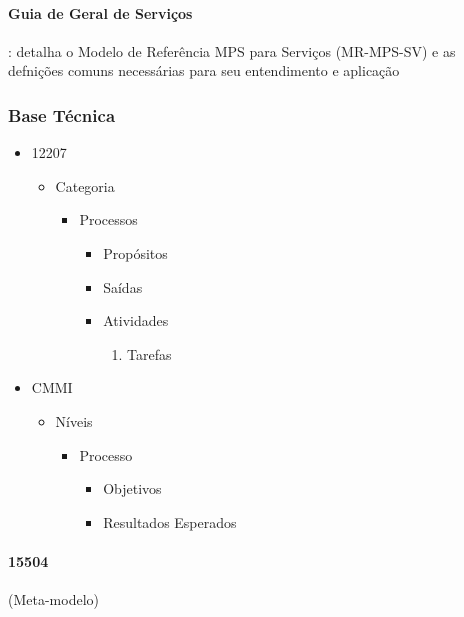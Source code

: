 \documentclass{article}
\begin{document}
\paragraph{Guia de Geral de Serviços} : detalha o Modelo de Referência MPS para Serviços (MR-MPS-SV) e as defnições comuns necessárias para seu entendimento e aplicação

\subsubsection{Base Técnica}
	\begin{itemize}
	\item 12207
		\begin{itemize}
		\item Categoria
			\begin{itemize}
			\item Processos
				\begin{itemize}
				\item Propósitos
				\item Saídas
				\item Atividades
					\begin{enumerate}
					\item Tarefas							
					\end{enumerate}
				\end{itemize}
			\end{itemize}
		\end{itemize}			
	\end{itemize}

	\begin{itemize}
	\item CMMI
		\begin{itemize}
		\item Níveis
			\begin{itemize}
			\item Processo
				\begin{itemize}
				\item Objetivos
				\item Resultados Esperados	
				\end{itemize}
			\end{itemize}
		\end{itemize}
			
	\end{itemize}

	\paragraph{15504}(Meta-modelo)
\end{document}
